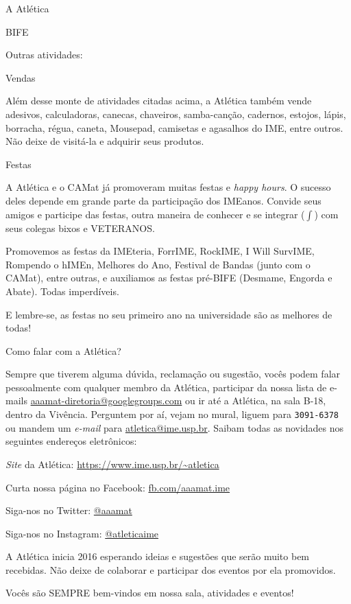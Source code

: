 \begin{secao}{A Atlética}
\begin{subsecao}{BIFE}
\end{subsecao}

Outras atividades:

\begin{subsecao}{Vendas}

Além desse monte de atividades citadas acima, a Atlética também vende
adesivos, calculadoras, canecas, chaveiros, samba-canção, cadernos, estojos,
lápis, borracha, régua, caneta, Mousepad, camisetas e agasalhos do IME,
entre outros. Não deixe de visitá-la e adquirir seus produtos.

\end{subsecao}

\begin{subsecao}{Festas}

A Atlética e o CAMat já promoveram muitas festas e \textit{happy hours}. O sucesso
deles depende em grande parte da participação dos IMEanos. Convide seus
amigos e participe das festas, outra maneira de conhecer e se
integrar ($\int$) com seus colegas bixos e VETERANOS.

Promovemos as festas da IMEteria, ForrIME, RockIME, I Will SurvIME, Rompendo o hIMEn,
Melhores do Ano, Festival de Bandas (junto com o CAMat), entre outras, e
auxiliamos as festas pré-BIFE (Desmame, Engorda e Abate). Todas imperdíveis.

E lembre-se, as festas no seu primeiro ano na universidade são as melhores de
todas!

\end{subsecao}

\begin{subsecao}{Como falar com a Atlética?}

Sempre que tiverem alguma dúvida, reclamação ou sugestão, vocês podem falar
pessoalmente com qualquer membro da Atlética, participar da nossa lista de e-mails \url{aaamat-diretoria@googlegroups.com} ou ir até a Atlética, na sala
B-18, dentro da Vivência.  Perguntem por aí, vejam no mural, liguem para {\tt 3091-6378} ou mandem um \textit{e-mail} para \url{atletica@ime.usp.br}.
Saibam todas as novidades nos seguintes endereços eletrônicos:

\textit{Site} da Atlética: \url{https://www.ime.usp.br/~atletica}

Curta nossa página no Facebook: \url{fb.com/aaamat.ime}

Siga-nos no Twitter: \url{@aaamat}

Siga-nos no Instagram: \url{@atleticaime}

A Atlética inicia 2016 esperando ideias e sugestões que serão muito bem %
recebidas. Não deixe de colaborar e participar dos eventos por ela promovidos.

Vocês são SEMPRE bem-vindos em nossa sala, atividades e eventos!

\end{subsecao}
\end{secao}
